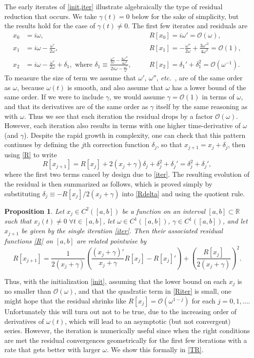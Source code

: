 \documentclass[10pt]{article}
\newcommand{\be}{\begin{equation}}
\newcommand{\ee}{\end{equation}}
\newcommand{\etc}{{\it etc.\ }}
\newcommand{\R}{\mathbb{R}}
\newcommand{\bigO}{{\mathcal O}}
\newtheorem{pro}[thm]{Proposition}
\newcommand{\om}{\omega}
\newcommand{\g}{\gamma}
\begin{document}
The early iterates of \cref{init,iter} illustrate
algebraically
the type of residual reduction that occurs. We take $\g(t) = 0$ below for the
sake of simplicity, but the results hold for the case of $\g(t) \neq 0$. The first few iterates and residuals are
\begin{align}
    x_0 &=  i\om, &&R[x_0] = i\om' = \bigO(\om), \nonumber \\
x_1 &= i\om - \frac{\om'}{2\om}, 
    &&R[x_1] = -\frac{\om''}{2\om} + \frac{3\om'^2}{4\om^2} = \bigO(1), \nonumber \\
x_2 &= i\om - \frac{\om'}{2\om} + \delta_1, \mbox{ where }
    \delta_1 \equiv \frac{\frac{\om''}{2\om} - \frac{3\om'^2}{4\om^2}}{2i\om - \frac{\om'}{\om}}, \quad
    &&R[x_2] = \delta_1' + \delta_1^2 = \bigO(\om^{-1}). \nonumber
\end{align}
To measure the size of term we assume that $\om'$, $\om''$, \etc, are
of the same order as $\om$, because $\om(t)$ is smooth,
and also assume that $\om$ has a lower bound of the same order. If we were to include $\g$, we would assume $\g = \bigO(1) $ in terms of $\om$, and that its derivatives are of the same order as $\g$ itself by the same reasoning as with $\om$. 
Thus we see that each iteration the residual drops by a factor $\bigO(\om)$.
However, each iteration also results in terms with
one higher time-derivative of $\om$ (and $\g$).
Despite the rapid growth in complexity, one can check that this
pattern continues
by defining the $j$th correction function $\delta_j$,
so that $x_{j+1} = x_j + \delta_j$, then using \cref{R} to write
\be
R[x_{j+1}] = R[x_j] + 2\left(x_j + \g \right)\delta_j  + \delta_j^2 + \delta_j' = \delta_j^2 + \delta_j',
\label{Rdelta}
\ee
where the first two terms cancel by design due to \cref{iter}.
The resulting evolution of the residual is then
summarized as follows, which is proved simply by
substituting $\delta_j \equiv -R[x_j]/2(x_j + \g)$ into \cref{Rdelta} and using
the quotient rule.
\begin{pro}\label{PRiter}
  Let $x_j \in C^2([a,b])$ be a function on an interval $[a,b]\subset \R$
  such that $x_j(t) \neq 0 \; \forall t\in [a,b]$,
  let $\om\in C^1([a,b])$,
  $\g\in C^1([a,b])$,
  and let $x_{j+1}$ be given by the single iteration \cref{iter}.
  Then their associated residual functions \cref{R} on $[a,b]$
  are related pointwise by
  \be
  \label{Riter}
    R[x_{j+1}] = \frac{1}{2(x_j + \g)}\left( \frac{(x_j + \g)'}{x_j + \g} R[x_j] - R[x_j]' \right) 
    + \left(\frac{R[x_j]}{2(x_j + \g)}\right)^2. 
  \ee
\end{pro}
Thus, with the initialization \cref{init},
assuming that the lower bound on each $x_j$ is no smaller than $\bigO(\om)$,
and that the quadratic term in \cref{Riter} is small,
one might hope that
the residual shrinks like $R[x_j] = \bigO(\om^{1-j})$ for each $j=0,1,\dots$.
Unfortunately this will turn out not to be true, due to the increasing
order of derivatives of $\om(t)$, which will lead to an
asymptotic (but not convergent) series.
However, the iteration is numerically useful since when the right conditions
are met the residual convergences geometrically for the first few iterations with a
rate that gets better with larger $\om$. We show this formally in \cref{TR}.
\end{document}
